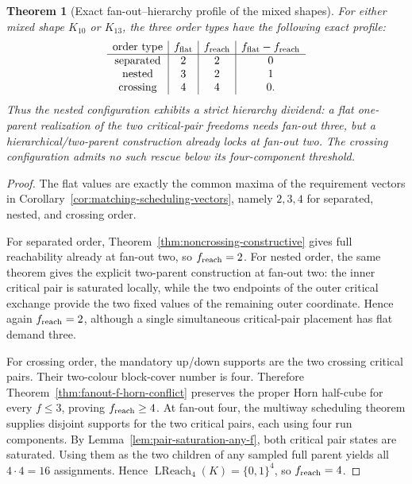 \documentclass[11pt]{article}
\newtheorem{theorem}[definition]{Theorem}
\begin{document}
\begin{theorem}[Exact fan-out--hierarchy profile of the mixed shapes]
\label{thm:exact-fanout-hierarchy-profile}
For either mixed shape $K_{10}$ or $K_{13}$, the three order types have the
following exact profile:
\[
\begin{array}{c|c|c|c}
\text{order type}&f_{\rm flat}&f_{\rm reach}&f_{\rm flat}-f_{\rm reach}\\
\hline
\text{separated}&2&2&0\\
\text{nested}&3&2&1\\
\text{crossing}&4&4&0.
\end{array}
\]
Thus the nested configuration exhibits a strict hierarchy dividend: a flat
one-parent realization of the two critical-pair freedoms needs fan-out three,
but a hierarchical/two-parent construction already locks at fan-out two.  The
crossing configuration admits no such rescue below its four-component
threshold.
\end{theorem}

\begin{proof}
The flat values are exactly the common maxima of the requirement vectors in
Corollary~\ref{cor:matching-scheduling-vectors}, namely $2,3,4$ for separated,
nested, and crossing order.

For separated order, Theorem~\ref{thm:noncrossing-constructive} gives full
reachability already at fan-out two, so $f_{\rm reach}=2$.  For nested order,
the same theorem gives the explicit two-parent construction at fan-out two:
the inner critical pair is saturated locally, while the two endpoints of the
outer critical exchange provide the two fixed values of the remaining outer
coordinate.  Hence again $f_{\rm reach}=2$, although a single simultaneous
critical-pair placement has flat demand three.

For crossing order, the mandatory up/down supports are the two crossing
critical pairs.  Their two-colour block-cover number is four.  Therefore
Theorem~\ref{thm:fanout-f-horn-conflict} preserves the proper Horn half-cube
for every $f\le3$, proving $f_{\rm reach}\ge4$.  At fan-out four, the multiway
scheduling theorem supplies disjoint supports for the two critical pairs, each
using four run components.  By Lemma~\ref{lem:pair-saturation-any-f}, both
critical pair states are saturated.  Using them as the two children of any
sampled full parent yields all $4\cdot4=16$ assignments.  Hence
$\operatorname{LReach}_4(K)=\{0,1\}^4$, so $f_{\rm reach}=4$.
\end{proof}
\end{document}
